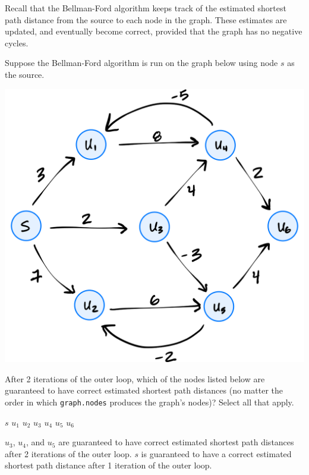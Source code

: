 \begin{prob}
    Recall that the Bellman-Ford algorithm keeps track of the estimated
    shortest path distance from the source to each node in the graph. These
    estimates are updated, and eventually become correct, provided that the
    graph has no negative cycles.

    Suppose the Bellman-Ford algorithm is run on the graph below using node $s$
    as the source.

    \includegraphics{./graph.png}

    After 2 iterations of the outer loop, which of the nodes listed below are
    guaranteed to have correct estimated shortest path distances (no matter the
    order in which \texttt{graph.nodes} produces the graph's nodes)? Select all
    that apply.

    \begin{choices}[rectangle]
        \correctchoice $s$
        \choice $u_1$
        \choice $u_2$
        \correctchoice $u_3$
        \correctchoice $u_4$
        \correctchoice $u_5$
        \choice $u_6$
    \end{choices}

    \begin{soln}
        $u_3$, $u_4$, and $u_5$ are guaranteed to have correct estimated shortest path distances after 2 iterations of the outer loop. $s$ is guaranteed to have a correct estimated shortest path distance after 1 iteration of the outer loop.
    \end{soln}


\end{prob}
